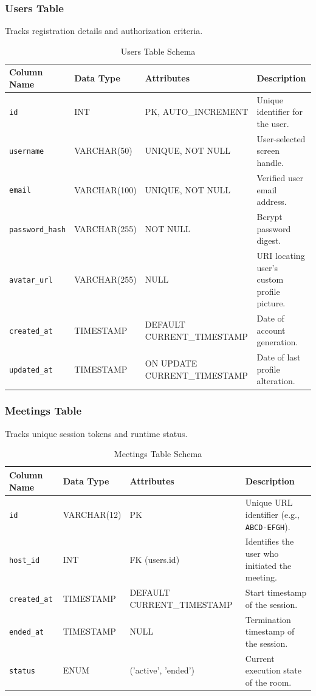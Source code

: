 \documentclass[11pt,a4paper]{article}
\begin{document}
\subsubsection{Users Table}
Tracks registration details and authorization criteria.
\begin{table}[h!]
\centering
\begin{tabular}{@{}llll@{}}
\toprule
\textbf{Column Name} & \textbf{Data Type} & \textbf{Attributes} & \textbf{Description} \\ \midrule
\texttt{id} & INT & PK, AUTO\_INCREMENT & Unique identifier for the user. \\
\texttt{username} & VARCHAR(50) & UNIQUE, NOT NULL & User-selected screen handle. \\
\texttt{email} & VARCHAR(100) & UNIQUE, NOT NULL & Verified user email address. \\
\texttt{password\_hash} & VARCHAR(255) & NOT NULL & Bcrypt password digest. \\
\texttt{avatar\_url} & VARCHAR(255) & NULL & URI locating user's custom profile picture. \\
\texttt{created\_at} & TIMESTAMP & DEFAULT CURRENT\_TIMESTAMP & Date of account generation. \\
\texttt{updated\_at} & TIMESTAMP & ON UPDATE CURRENT\_TIMESTAMP & Date of last profile alteration. \\ \bottomrule
\end{tabular}
\caption{Users Table Schema}
\label{tab:users_table}
\end{table}

\subsubsection{Meetings Table}
Tracks unique session tokens and runtime status.
\begin{table}[h!]
\centering
\begin{tabular}{@{}llll@{}}
\toprule
\textbf{Column Name} & \textbf{Data Type} & \textbf{Attributes} & \textbf{Description} \\ \midrule
\texttt{id} & VARCHAR(12) & PK & Unique URL identifier (e.g., \texttt{ABCD-EFGH}). \\
\texttt{host\_id} & INT & FK (users.id) & Identifies the user who initiated the meeting. \\
\texttt{created\_at} & TIMESTAMP & DEFAULT CURRENT\_TIMESTAMP & Start timestamp of the session. \\
\texttt{ended\_at} & TIMESTAMP & NULL & Termination timestamp of the session. \\
\texttt{status} & ENUM & ('active', 'ended') & Current execution state of the room. \\ \bottomrule
\end{tabular}
\caption{Meetings Table Schema}
\label{tab:meetings_table}
\end{table}
\end{document}
